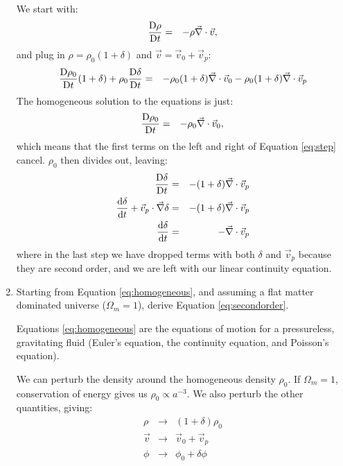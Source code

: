 \begin{enumerate}
\begin{answer}
We start with:
\begin{eqnarray}
\frac{{\rm D}\rho}{{\rm D} t} &=& - \rho \vec{\nabla}\cdot\vec{v},
\end{eqnarray}
and plug in $\rho = \rho_0(1+\delta)$ and $\vec{v} = \vec{v}_0
+ \vec{v}_p$:
\begin{eqnarray}
\label{eq:step}
\frac{{\rm D}\rho_0}{{\rm D} t}(1 + \delta)
+ \rho_0 \frac{{\rm D}\delta}{{\rm D} t}
&=& - \rho_0 (1 + \delta) \vec{\nabla}\cdot\vec{v}_0
- \rho_0 (1+\delta) \vec{\nabla}\cdot\vec{v}_p
\end{eqnarray}
The homogeneous solution to the equations is just:
\begin{eqnarray}
\frac{{\rm D}\rho_0}{{\rm D} t}
&=& - \rho_0 \vec{\nabla}\cdot\vec{v}_0,
\end{eqnarray}
which means that the first terms on the left and right of
Equation \ref{eq:step} cancel. $\rho_0$ then divides out, leaving:
\begin{eqnarray}
\frac{{\rm D}\delta}{{\rm D} t}
&=& - (1 + \delta) \vec{\nabla}\cdot\vec{v}_p\cr
\frac{{\rm d}\delta}{{\rm d} t} + \vec{v}_p\cdot\vec{\nabla}\delta
&=& - (1 + \delta) \vec{\nabla}\cdot\vec{v}_p\cr
\frac{{\rm d}\delta}{{\rm d} t}
&=& - \vec{\nabla}\cdot\vec{v}_p
\end{eqnarray}
where in the last step we have dropped terms with both $\delta$ and
$\vec{v}_p$ because they are second order, and we are left with our
linear continuity equation. 
\end{answer}


\item Starting from Equation \ref{eq:homogeneous}, and assuming a flat
    matter dominated universe ($\Omega_m = 1$), derive
    Equation \ref{eq:secondorder}.

\begin{answer}
Equations \ref{eq:homogeneous} are the equations of motion for a
pressureless, gravitating fluid (Euler's equation, the continuity
equation, and Poisson's equation).

We can perturb the density around the homogeneous density $\rho_0$.
If $\Omega_m = 1$, conservation of energy gives us $\rho_0
\propto a^{-3}$. We also perturb the other quantities, giving:
\begin{eqnarray}
\rho  &\rightarrow& (1+\delta)\rho_0 \\
\vec{v} &\rightarrow& \vec{v}_0 + \vec{v}_p \\
\phi  &\rightarrow& \phi_0 + \delta\phi
\end{eqnarray}


\end{answer}
\end{enumerate}
